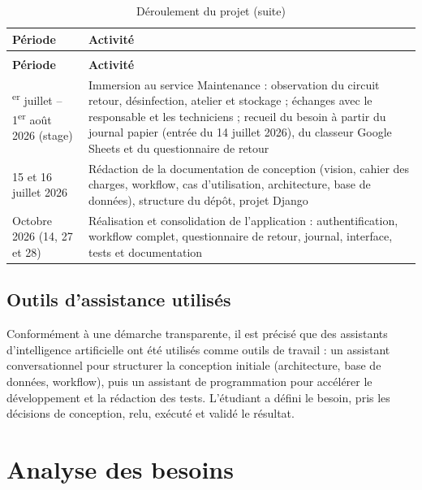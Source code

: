{\small{}\renewcommand{\arraystretch}{1.3}
\begin{longtable}{|>{\raggedright\arraybackslash}p{4.11cm}|>{\raggedright\arraybackslash}p{10.50cm}|}
\caption{Déroulement du projet}\\
\hline
\rowcolor{ALbleu} \sffamily\bfseries\color{white} Période & \sffamily\bfseries\color{white} Activité \\ \hline
\endfirsthead
\caption[]{Déroulement du projet (suite)}\\
\hline
\rowcolor{ALbleu} \sffamily\bfseries\color{white} Période & \sffamily\bfseries\color{white} Activité \\ \hline
\endhead
1\textsuperscript{er} juillet – 1\textsuperscript{er} août 2026 (stage) & Immersion au service Maintenance : observation du circuit retour, désinfection, atelier et stockage ; échanges avec le responsable et les techniciens ; recueil du besoin à partir du journal papier (entrée du 14 juillet 2026), du classeur Google Sheets et du questionnaire de retour \\ \hline
\rowcolor{ALgris} 15 et 16 juillet 2026 & Rédaction de la documentation de conception (vision, cahier des charges, workflow, cas d'utilisation, architecture, base de données), structure du dépôt, projet Django \\ \hline
Octobre 2026 (14, 27 et 28) & Réalisation et consolidation de l'application : authentification, workflow complet, questionnaire de retour, journal, interface, tests et documentation \\ \hline
\end{longtable}
}

\subsection{Outils d'assistance utilisés}

Conformément à une démarche transparente, il est précisé que des assistants d'intelligence artificielle ont été utilisés comme outils de travail : un assistant conversationnel pour structurer la conception initiale (architecture, base de données, workflow), puis un assistant de programmation pour accélérer le développement et la rédaction des tests. L'étudiant a défini le besoin, pris les décisions de conception, relu, exécuté et validé le résultat.

\section{Analyse des besoins}

